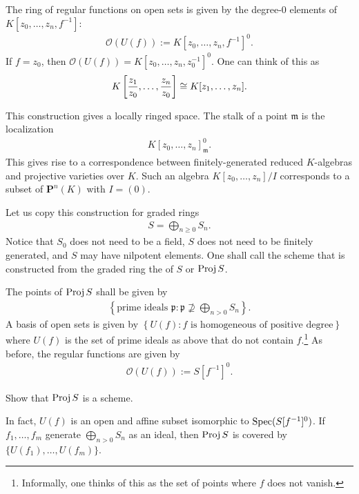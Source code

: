 \documentclass [11 pt, oneside] {article}
\begin{document}
The ring of regular functions on open sets is given by the degree-$0$ elements of $K[z_0,\hdots, z_n,f^{-1}]$:
\begin{align*}
	\mathscr{O}(U(f)) := K[z_0,\hdots, z_n,f^{-1}]^0.
\end{align*}
If $f=z_0$, then $\mathscr{O}(U(f)) =K[z_0,\hdots, z_n,z_0^{-1}]^0$. One can think of this as
\begin{align*}
	K \left[ \frac{z_1}{z_0}, \hdots, \frac{z_n}{z_0} \right] \cong K[z_1,\hdots,z_n]. 
\end{align*}

This construction gives a locally ringed space. The stalk of a point $\mathfrak{m}$ is the localization
\begin{align*}
	K[z_0,\hdots, z_n]^0_{\mathfrak{m}}.
\end{align*}
This gives rise to a correspondence between finitely-generated reduced $K$-algebras and projective varieties over $K$. Such an algebra $K[z_0,\hdots, z_n]/I$ corresponds to a subset of $\mathbf{P}^n(K)$ with $I=(0)$.

Let us copy this construction for graded rings
\begin{align*}
	S = \bigoplus_{n\ge 0}S_n.
\end{align*}
Notice that $S_0$ does not need to be a field, $S$ does not need to be finitely generated, and $S$ may have nilpotent elements.
One shall call the scheme that is constructed from the graded ring the  of $S$ or {$\operatorname{Proj} S$}.

The points of $\operatorname{Proj} S$ shall be given by
\begin{align*}
	\left\{ \textrm{prime ideals $\mathfrak{p}$} : \mathfrak{p} \nsupseteq \bigoplus_{n>0}S_n\right\}. 
\end{align*}
A basis of open sets is given by $\left\{U(f) : \textrm{$f$ is homogeneous of positive degree}\right\}$ where $U(f)$ is the set of prime ideals as above that do not contain $f$.\footnote{Informally, one thinks of this as the set of points where $f$ does not vanish.} As before, the regular functions are given by
\begin{align*}
	\mathscr{O}(U(f)) := S[f ^{-1}]^0.
\end{align*}

\begin{exercise}\label{}\text{}
Show that $\operatorname{Proj} S$ is a scheme.
\end{exercise}

In fact, $U(f)$ is an open and affine subset isomorphic to $\operatorname{Spec}(S[f^{-1}]^0)$. If $f_1,\hdots, f_m$ generate $\bigoplus_{n>0}S_n$ as an ideal, then $\operatorname{Proj} S$ is covered by $\{U(f_1),\hdots,U(f_m)\}$. 
\end{document}

